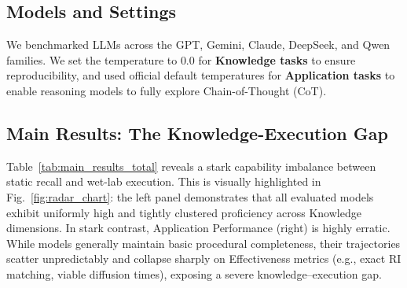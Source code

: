 \documentclass[runningheads]{llncs}
\begin{document}
\subsection{Models and Settings}
We benchmarked LLMs across the GPT, Gemini, Claude, DeepSeek, and Qwen families. We set the temperature to $0.0$ for \textbf{Knowledge tasks} to ensure reproducibility, and used official default temperatures for \textbf{Application tasks} to enable reasoning models to fully explore Chain-of-Thought (CoT).

\subsection{Main Results: The Knowledge-Execution Gap}
Table~\ref{tab:main_results_total} reveals a stark capability imbalance between static recall and wet-lab execution. This is visually highlighted in Fig.~\ref{fig:radar_chart}: the left panel demonstrates that all evaluated models exhibit uniformly high and tightly clustered proficiency across Knowledge dimensions. In stark contrast, Application Performance (right) is highly erratic. While models generally maintain basic procedural completeness, their trajectories scatter unpredictably and collapse sharply on Effectiveness metrics (e.g., exact RI matching, viable diffusion times), exposing a severe knowledge--execution gap.
\end{document}
